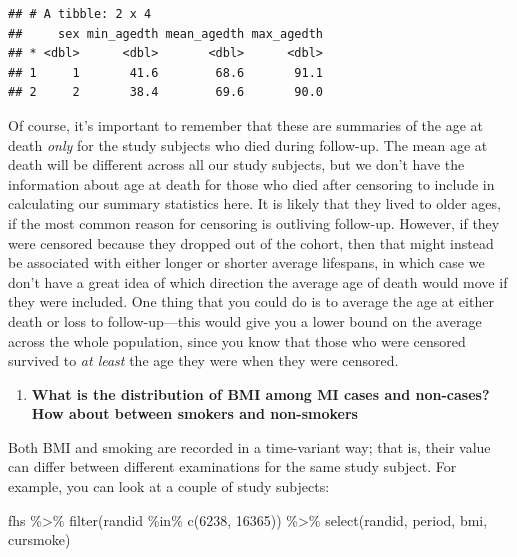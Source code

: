 \documentclass[
]{book}
\newenvironment{Shaded}{\begin{snugshade}}{\end{snugshade}}
\newcommand{\DecValTok}[1]{\textcolor[rgb]{0.00,0.00,0.81}{#1}}
\newcommand{\FunctionTok}[1]{\textcolor[rgb]{0.00,0.00,0.00}{#1}}
\newcommand{\NormalTok}[1]{#1}
\newcommand{\SpecialCharTok}[1]{\textcolor[rgb]{0.00,0.00,0.00}{#1}}
\providecommand{\tightlist}{%
  \setlength{\itemsep}{0pt}\setlength{\parskip}{0pt}}
\begin{document}
\begin{verbatim}
## # A tibble: 2 x 4
##     sex min_agedth mean_agedth max_agedth
## * <dbl>      <dbl>       <dbl>      <dbl>
## 1     1       41.6        68.6       91.1
## 2     2       38.4        69.6       90.0
\end{verbatim}

Of course, it's important to remember that these are summaries of the age at death \emph{only} for the study subjects who died during follow-up. The mean age at death will be different across all our study subjects, but we don't have the information about age at death for those who died after censoring to include in calculating our summary statistics here. It is likely that they lived to older ages, if the most common reason for censoring is outliving follow-up. However, if they were censored because they dropped out of the cohort, then that might instead be associated with either longer or shorter average lifespans, in which case we don't have a great idea of which direction the average age of death would move if they were included. One thing that you could do is to average the age at either death or loss to follow-up---this would give you a lower bound on the average across the whole population, since you know that those who were censored survived to \emph{at least} the age they were when they were censored.

\begin{enumerate}
\def\labelenumi{\arabic{enumi}.}
\setcounter{enumi}{3}
\tightlist
\item
  \textbf{What is the distribution of BMI among MI cases and non-cases? How about between smokers and non-smokers}
\end{enumerate}

Both BMI and smoking are recorded in a time-variant way; that is, their value can differ between different examinations for the same study subject. For example, you can look at a couple of study subjects:

\begin{Shaded}
\begin{Highlighting}[]
\NormalTok{fhs }\SpecialCharTok{\%\textgreater{}\%} 
  \FunctionTok{filter}\NormalTok{(randid }\SpecialCharTok{\%in\%} \FunctionTok{c}\NormalTok{(}\DecValTok{6238}\NormalTok{, }\DecValTok{16365}\NormalTok{)) }\SpecialCharTok{\%\textgreater{}\%} 
  \FunctionTok{select}\NormalTok{(randid, period, bmi, cursmoke)}
\end{Highlighting}
\end{Shaded}
\end{document}
